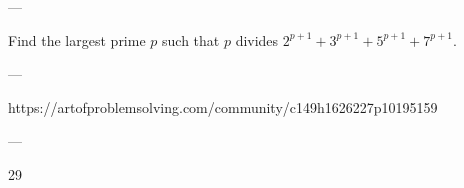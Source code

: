 
---

Find the largest prime $p$ such that $p$ divides $2^{p+1}+3^{p+1}+5^{p+1}+7^{p+1}$.

---

https://artofproblemsolving.com/community/c149h1626227p10195159

---

29
